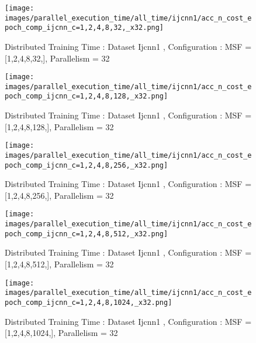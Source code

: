 \begin{figure*}[htbp]
\centering
\texttt{[image: images/parallel\_execution\_time/all\_time/ijcnn1/acc\_n\_cost\_epoch\_comp\_ijcnn\_c=1,2,4,8,32,\_x32.png]}
\caption{Distributed Training Time : Dataset Ijcnn1 , Configuration : MSF = [1,2,4,8,32,], Parallelism = 32}
\label{fig:dis-msf-tr-time-ijcnn1-x32}
\end{figure*}


\begin{figure*}[htbp]
\centering
\texttt{[image: images/parallel\_execution\_time/all\_time/ijcnn1/acc\_n\_cost\_epoch\_comp\_ijcnn\_c=1,2,4,8,128,\_x32.png]}
\caption{Distributed Training Time : Dataset Ijcnn1 , Configuration : MSF = [1,2,4,8,128,], Parallelism = 32}
\label{fig:dis-msf-tr-time-ijcnn1-x32}
\end{figure*}


\begin{figure*}[htbp]
\centering
\texttt{[image: images/parallel\_execution\_time/all\_time/ijcnn1/acc\_n\_cost\_epoch\_comp\_ijcnn\_c=1,2,4,8,256,\_x32.png]}
\caption{Distributed Training Time : Dataset Ijcnn1 , Configuration : MSF = [1,2,4,8,256,], Parallelism = 32}
\label{fig:dis-msf-tr-time-ijcnn1-x32}
\end{figure*}


\begin{figure*}[htbp]
\centering
\texttt{[image: images/parallel\_execution\_time/all\_time/ijcnn1/acc\_n\_cost\_epoch\_comp\_ijcnn\_c=1,2,4,8,512,\_x32.png]}
\caption{Distributed Training Time : Dataset Ijcnn1 , Configuration : MSF = [1,2,4,8,512,], Parallelism = 32}
\label{fig:dis-msf-tr-time-ijcnn1-x32}
\end{figure*}


\begin{figure*}[htbp]
\centering
\texttt{[image: images/parallel\_execution\_time/all\_time/ijcnn1/acc\_n\_cost\_epoch\_comp\_ijcnn\_c=1,2,4,8,1024,\_x32.png]}
\caption{Distributed Training Time : Dataset Ijcnn1 , Configuration : MSF = [1,2,4,8,1024,], Parallelism = 32}
\label{fig:dis-msf-tr-time-ijcnn1-x32}
\end{figure*}


